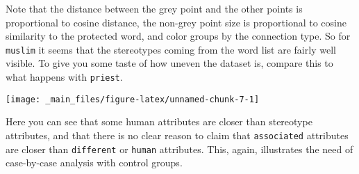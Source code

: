 \documentclass[]{book}
\newenvironment{Shaded}{\begin{snugshade}}{\end{snugshade}}
\newcommand{\KeywordTok}[1]{\textcolor[rgb]{0.13,0.29,0.53}{\textbf{#1}}}
\newcommand{\DecValTok}[1]{\textcolor[rgb]{0.00,0.00,0.81}{#1}}
\newcommand{\StringTok}[1]{\textcolor[rgb]{0.31,0.60,0.02}{#1}}
\newcommand{\CommentTok}[1]{\textcolor[rgb]{0.56,0.35,0.01}{\textit{#1}}}
\newcommand{\OperatorTok}[1]{\textcolor[rgb]{0.81,0.36,0.00}{\textbf{#1}}}
\newcommand{\NormalTok}[1]{#1}
\begin{document}
\normalsize

Note that the distance between the grey point and the other points is
proportional to cosine distance, the non-grey point size is proportional
to cosine similarity to the protected word, and color groups by the
connection type. So for \texttt{muslim} it seems that the stereotypes
coming from the word list are fairly well visible. To give you some
taste of how uneven the dataset is, compare this to what happens with
\texttt{priest}.

\vspace{1mm} \footnotesize

\begin{Shaded}
\end{Shaded}

\begin{center}\texttt{[image: \_main\_files/figure-latex/unnamed-chunk-7-1]} \end{center}

\normalsize

\noindent Here you can see that some human attributes are closer than
stereotype attributes, and that there is no clear reason to claim that
\texttt{associated} attributes are closer than \texttt{different} or
\texttt{human} attributes. This, again, illustrates the need of
case-by-case analysis with control groups.
\end{document}
